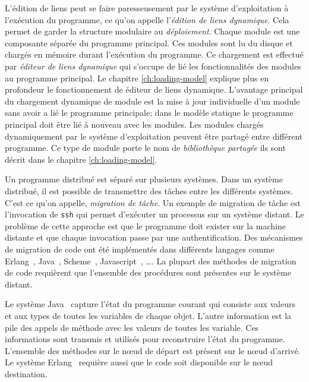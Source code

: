 L'édition de liens peut se faire paresseusement par le système d'exploitation à
l'exécution du programme, ce qu'on appelle l'\textit{édition de liens dynamique}.  Cela
permet de garder la structure modulaire au \textit{déploiement}.
Chaque module est une composante séparée du programme principal.  Ces modules
sont lu du disque et chargés en mémoire durant l'exécution du programme.  Ce
chargement est effectué par \textit{éditeur de liens dynamique} qui s'occupe de
lié les fonctionnalités des modules au programme principal. Le chapitre %
\ref{ch:loading-model} explique plus en profondeur le fonctionnement de éditeur de liens
dynamique. L'avantage principal du chargement dynamique de module est la mise à jour
individuelle d'un module sans avoir a lié le programme principale; dans le
modèle statique le programme principal doit être lié à nouveau avec les modules.
Les modules chargés dynamiquement par le système d'exploitation peuvent être partagé entre différent
programme. Ce type de module porte le nom de \textit{bibliothèque partagée} ils sont décrit dans
le chapitre \ref{ch:loading-model}.


Un programme distribué est séparé sur plusieurs systèmes. Dans un système
distribué, il est possible de transmettre des tâches entre les différents
systèmes. C'est ce qu'on appelle, \textit{migration de tâche}.  Un exemple de
migration de tâche est l'invocation de \texttt{ssh} qui permet d'exécuter un
processus sur un système distant. Le problème de cette approche est que le
programme doit exister sur la machine distante et que chaque invocation passe
par une authentification. Des mécanismes de migration de code ont été
implémentés dans différents langages comme Erlang~\cite{M_mobileintelligent},
Java~\cite{And98transparentmigration}, Scheme~\cite{Sumii00animplementation},
Javascript~\cite{DEV2017transparentmigration}, \dots.  La plupart des méthodes
de migration de code requièrent que l'ensemble des procédures sont
présentes sur le système distant.

Le système Java~\cite{And98transparentmigration} capture l'état du programme courant
qui consiste aux valeurs et aux types de toutes les variables de chaque objet. L'autre
information est la pile des appels de méthode avec les valeurs de toutes les variable.
Ces informations sont transmis et utilisés pour reconstruire l'état du programme.
L'ensemble des méthodes sur le nœud de départ est présent sur le nœud d'arrivé.
Le système Erlang~\cite{M_mobileintelligent} requière aussi que le code soit disponible
sur le nœud destination.

